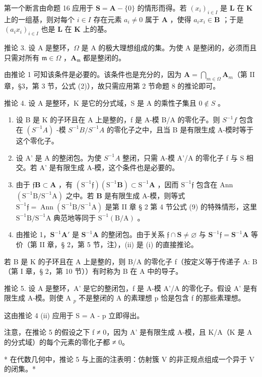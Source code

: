 第一个断言由命题 16 应用于 \(\mathbf{S} = \mathbf{A} - \{0\}\) 的情形而得。若 \((x_{i})_{i\in I}\) 是 \(\mathbf{L}\) 在 \(\mathbf{K}\) 上的一组基，则对每个 \(i\in I\) 存在元素 \(a_{i}\neq 0\) 属于 \(\mathbf{A}\) ，使得 \(a_{i}x_{i}\in \mathbf{B}\) ；于是 \((a_{i}x_{i})_{i\in I}\) 也是 \(\mathbf{L}\) 在 \(\mathbf{K}\) 上的基。

推论 3. 设 A 是整环，\(\Omega\) 是 A 的极大理想组成的集。为使 A 是整闭的，必须而且只需对所有 \(\mathfrak{m} \in \Omega\) ，\(\mathbf{A}_{\mathfrak{m}}\) 都是整闭的。

由推论 1 可知该条件是必要的。该条件也是充分的，因为 \(\mathbf{A} = \bigcap_{m \in \Omega} \mathbf{A}_m\)（第 II 章，§3，第 3 节，公式 (2)），故只需应用第 2 节命题 8 的推论即可。

推论 4. 设 A 是整环，K 是它的分式域，S 是 A 的乘性子集且 \(0 \notin S\) 。

\begin{enumerate}
\def\labelenumi{(\roman{enumi})}
\item
  设 B 是 K 的子环且在 A 上是整的，f 是 A-模 B/A 的零化子。则 \(S^{-1}f\) 包含在 \((S^{-1}A)\) -模 \(S^{-1}B/S^{-1}A\) 的零化子之中，且当 B 是有限生成 A-模时等于这个零化子。
\item
  设 A' 是 A 的整闭包。为使 \(S^{-1}A\) 整闭，只需 A-模 A'/A 的零化子 f 与 S 相交。若 A' 是有限生成 A-模，这个条件也是必要的。
\setcounter{enumi}{0}
\item
  由于 \(\mathfrak{f}\mathbf{B} \subset \mathbf{A}\) ，有 \((\mathrm{S}^{-1}\mathfrak{f})(\mathrm{S}^{-1}\mathbf{B}) \subset \mathrm{S}^{-1}\mathbf{A}\) ，因而 \(\mathrm{S}^{-1}\mathfrak{f}\) 包含在 Ann \((\mathrm{S}^{-1}\mathrm{B} / \mathrm{S}^{-1}\mathrm{A})\) 之中。若 \(\mathbf{B}\) 是有限生成 A-模，则等式 \(\mathrm{S}^{-1}\mathfrak{f} = \operatorname{Ann}(\mathrm{S}^{-1}\mathrm{B} / \mathrm{S}^{-1}\mathrm{A})\) 是第 II 章 § 2 第 4 节公式 (9) 的特殊情形，这里 \(\mathrm{S}^{-1}\mathrm{B} / \mathrm{S}^{-1}\mathrm{A}\) 典范地等同于 \(\mathrm{S}^{-1}(\mathrm{B} / \mathrm{A})\) 。
\item
  由推论 1，\(\mathbf{S}^{-1}\mathbf{A}'\) 是 \(\mathbf{S}^{-1}\mathbf{A}\) 的整闭包。由于关系 \(\mathfrak{f} \cap \mathbf{S} \neq \varnothing\) 与 \(\mathbf{S}^{-1}\mathfrak{f} = \mathbf{S}^{-1}\mathbf{A}\) 等价（第 II 章，§ 2，第 5 节，注），(ii) 是 (i) 的直接推论。
\end{enumerate}

若 B 是 K 的子环且在 A 上是整的，则 B/A 的零化子 f（按定义等于传递子 A: B（第 I 章，§ 2，第 10 节））有时称为 B 在 A 中的导子。

推论 5. 设 A 是整环，A' 是它的整闭包，f 是 A-模 A'/A 的零化子。假设 A' 是有限生成 A-模。则使 A \(_{p}\) 不是整闭的 A 的素理想 p 恰是包含 f 的那些素理想。

这由推论 4 (ii) 应用于 S = A - p 立即得出。

注意，在推论 5 的假设之下 f ≠ 0，因为 A' 是有限生成 A-模，且 K/A（K 是 A 的分式域）的每个元素的零化子都 ≠ 0。

* 在代数几何中，推论 5 与上面的注表明：仿射簇 V 的非正规点组成一个异于 V 的闭集。*

